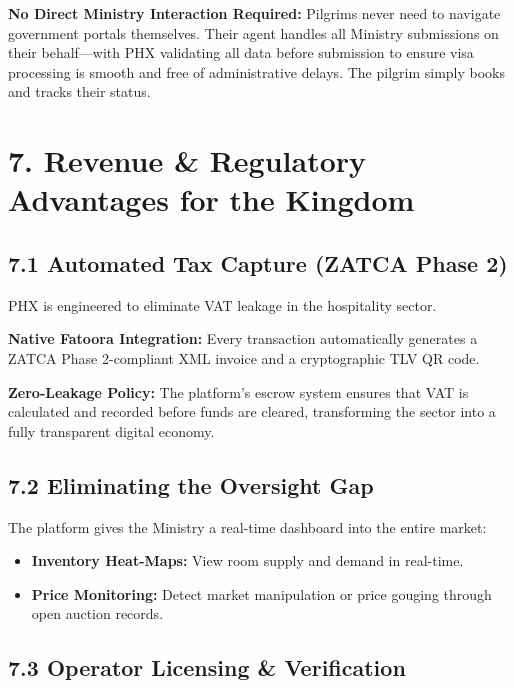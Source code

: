 \documentclass[11pt,a4paper]{article}
\begin{document}
\textbf{No Direct Ministry Interaction Required:} Pilgrims never need to navigate government portals themselves. Their agent handles all Ministry submissions on their behalf---with PHX validating all data before submission to ensure visa processing is smooth and free of administrative delays. The pilgrim simply books and tracks their status.

\section*{7. Revenue \& Regulatory Advantages for the Kingdom}

\subsection*{7.1 Automated Tax Capture (ZATCA Phase 2)}


PHX is engineered to eliminate VAT leakage in the hospitality sector.


\vspace{0.3cm}

\textbf{Native Fatoora Integration:} Every transaction automatically generates a ZATCA Phase 2-compliant XML invoice and a cryptographic TLV QR code.

\vspace{0.3cm}

\textbf{Zero-Leakage Policy:} The platform's escrow system ensures that VAT is calculated and recorded before funds are cleared, transforming the sector into a fully transparent digital economy.

\subsection*{7.2 Eliminating the Oversight Gap}


The platform gives the Ministry a real-time dashboard into the entire market:


\begin{itemize}
  \item \textbf{Inventory Heat-Maps:} View room supply and demand in real-time.
  \item \textbf{Price Monitoring:} Detect market manipulation or price gouging through open auction records.
\end{itemize}

\subsection*{7.3 Operator Licensing \& Verification}
\end{document}
